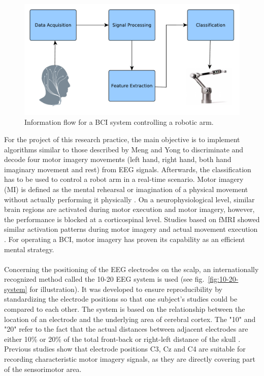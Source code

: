 \documentclass[a4paper,oneside, openright,12pt]{report}
\begin{document}
\begin{figure}[htbp]
	\centering
	\includegraphics[width=0.8\linewidth]{./gfx/BCI_control_system.pdf}
	\caption{Information flow for a BCI system controlling a robotic arm.}
	\label{fig:bci_control_system}
\end{figure}
For the project of this research practice, the main objective is to implement algorithms similar to those described by Meng and Yong \cite{meng2016noninvasive,yong2015eeg} to discriminate and decode four motor imagery movements (left hand, right hand, both hand imaginary movement and
rest) from EEG signals. Afterwards, the classification has to be used to control a robot arm in a real-time scenario. Motor imagery (MI) is defined as the mental rehearsal or imagination of a physical movement without actually performing it physically \cite{decety1996neurophysiological}. On a neurophysiological level, similar brain regions are activated during motor execution and motor imagery, however, the performance is blocked at a corticospinal level. Studies based on fMRI showed similar activation patterns during motor imagery and actual movement execution \cite{lotze1999activation}. For operating a BCI, motor imagery has proven its capability as an efficient mental strategy. \\\\
Concerning the positioning of the EEG electrodes on the scalp, an internationally recognized method called the 10-20 EEG system is used (see fig.~\ref{fig:10-20-system} for illustration). It was developed to ensure reproducibility by standardizing the electrode positions so that one subject's studies could be compared to each other. The system is based on the relationship between the location of an electrode and the underlying area of cerebral cortex. The "10" and "20" refer to the fact that the actual distances between adjacent electrodes are either 10\% or 20\% of the total front-back or right-left distance of the skull \cite{homan1987cerebral}. Previous studies show that electrode positions C3, Cz and C4 are suitable for recording characteristic motor imagery signals, as they are directly covering part of the sensorimotor area. \\
\end{document}
